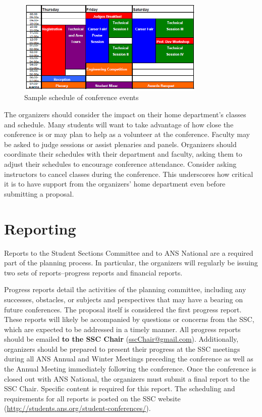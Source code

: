 \documentclass[12pt]{article}
\begin{document}
\begin{figure}[h]
    \centering
    \includegraphics[width=0.8\textwidth]{SampSched.PNG}
    \caption{Sample schedule of conference events}
    \label{fig:Schedule}
\end{figure}


The organizers should consider the impact on their home department's classes and schedule.
Many students will want to take advantage of how close the conference is or may plan to help as a volunteer at the conference.
Faculty may be asked to judge sessions or assist plenaries and panels.
Organizers should coordinate their schedules with their department and faculty, asking them to adjust their schedules to encourage conference attendance.
Consider asking instructors to cancel classes during the conference.
This underscores how critical it is to have support from the organizers' home department even before submitting a proposal.

\clearpage

\section{Reporting}
Reports to the Student Sections Committee and to ANS National are a required part of the planning process.
In particular, the organizers will regularly be issuing two sets of reports\---progress reports and financial reports.

Progress reports detail the activities of the planning committee, including any successes, obstacles, or subjects and perspectives that may have a bearing on future conferences.
The proposal itself is considered the first progress report.
These reports will likely be accompanied by questions or concerns from the SSC, which are expected to be addressed in a timely manner.
All progress reports should be emailed \textbf{to the SSC Chair} (\href{mailto:sscChair@gmail.com}{sscChair@gmail.com}).
Additionally, organizers should be prepared to present their progress at the SSC meetings during all ANS Annual and Winter Meetings preceding the conference as well as the Annual Meeting immediately following the conference.
Once the conference is closed out with ANS National, the organizers must submit a final report to the SSC Chair.
Specific content is required for this report.
The scheduling and requirements for all reports is posted on the SSC website (\href{http://students.ans.org/student-conferences/}{http://students.ans.org/student-conferences/}).
\end{document}
